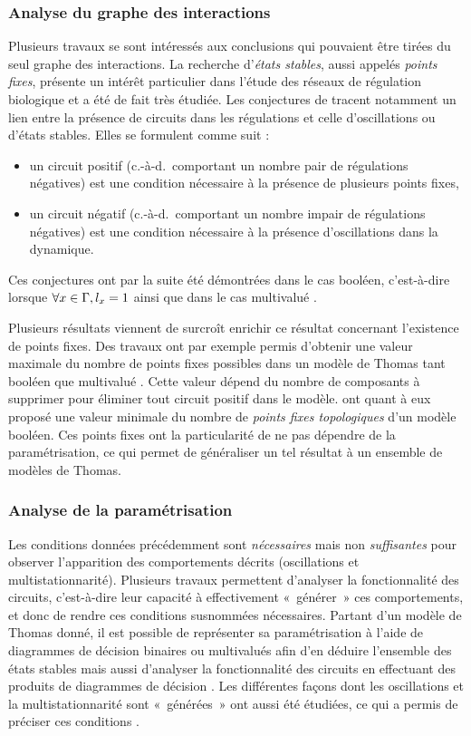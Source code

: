 \subsubsection*{Analyse du graphe des interactions}
Plusieurs travaux se sont intéressés aux conclusions qui pouvaient être
tirées du seul graphe des interactions.
La recherche d'\emph{états stables}, aussi appelés \emph{points fixes},
présente un intérêt particulier dans l'étude des réseaux de régulation biologique
et a été de fait très étudiée.
Les conjectures de 
tracent notamment un lien entre la présence de circuits dans les régulations et celle
d'oscillations ou d'états stables.
Elles se formulent comme suit :
\begin{itemize}
  \item un circuit positif (c.-à-d.~comportant un nombre pair de régulations négatives)
    est une condition nécessaire à la présence de plusieurs points fixes,
  \item un circuit négatif (c.-à-d.~comportant un nombre impair de régulations négatives)
    est une condition nécessaire à la présence d'oscillations dans la dynamique.
\end{itemize}
Ces conjectures ont par la suite été démontrées
dans le cas booléen, c'est-à-dire lorsque $\forall x \in \mathrm{\Gamma}, l_x = 1$
\cite{RRT08,Richard06thesis}
ainsi que dans le cas multivalué \cite{RiCo07,Richard10}.

Plusieurs résultats viennent de surcroît enrichir ce résultat concernant
l'existence de points fixes.
Des travaux ont par exemple
permis d'obtenir une valeur maximale du nombre de points fixes possibles
dans un modèle de Thomas tant booléen \cite{aracena2008maximum} que multivalué \cite{Richard09}.
Cette valeur dépend du nombre de composants à supprimer pour éliminer
tout circuit positif dans le modèle.
 ont quant à eux proposé une valeur minimale du nombre de
\emph{points fixes topologiques} d'un modèle booléen.
Ces points fixes ont la particularité de ne pas dépendre de la paramétrisation,
ce qui permet de généraliser un tel résultat à un ensemble de modèles de Thomas.

\subsubsection*{Analyse de la paramétrisation}
Les conditions données précédemment sont \emph{nécessaires} mais non \emph{suffisantes}
pour observer l'apparition des comportements décrits (oscillations et multistationnarité).
Plusieurs travaux permettent d'analyser la fonctionnalité des circuits,
c'est-à-dire leur capacité à effectivement «~générer~» ces comportements,
et donc de rendre ces conditions susnommées nécessaires.
Partant d'un modèle de Thomas donné,
il est possible de représenter sa paramétrisation
à l'aide de diagrammes de décision binaires ou multivalués \cite{Bryant86,Srinivasan90}
afin d'en déduire
l'ensemble des états stables mais aussi d'analyser la fonctionnalité des circuits
en effectuant des produits de diagrammes de décision \cite{Naldi07}.
Les différentes façons dont les oscillations et la multistationnarité sont «~générées~»
ont aussi été étudiées, ce qui a permis de préciser ces conditions \cite{Comet13}.

